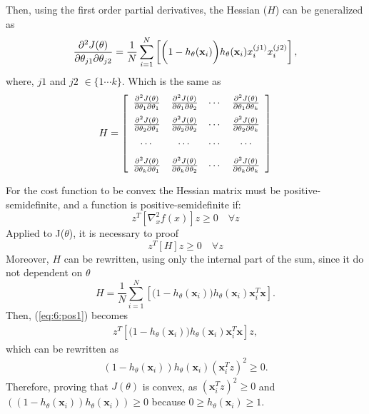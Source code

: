 Then, using the first order partial derivatives, the Hessian ($H$) can be generalized as
\begin{equation}
  \frac{\partial^2 J(\theta)}{\partial\theta_{j1}\partial\theta_{j2}}=\frac{1}{N}\sum_{i=1}^{N}
  \left[\bigg(1-h_\theta(\mathbf{x}_i)\bigg)h_\theta(\mathbf{x}_i)x_i^{(j1)}x_i^{(j2)}\right],
\end{equation}
where, $j1$ and $j2$ $\in \{1\cdots k\}$. Which is the same as
\begin{equation}
H=\left[ \begin{array}{cccc}
  \frac{\partial^2 J(\theta)}{\partial\theta_{1}\partial\theta_{1}} & \frac{\partial^2 J(\theta)}{\partial\theta_{1}\partial\theta_{2}} & \cdots & \frac{\partial^2 J(\theta)}{\partial\theta_{1}\partial\theta_{k}} \\[0.1in]  
  \frac{\partial^2 J(\theta)}{\partial\theta_{2}\partial\theta_{1}} & \frac{\partial^2 J(\theta)}{\partial\theta_{2}\partial\theta_{2}} & \cdots & \frac{\partial^2 J(\theta)}{\partial\theta_{2}\partial\theta_{k}} \\[0.1in]  
  \cdots & \cdots & \cdots & \cdots \\[0.1in]  
  \frac{\partial^2 J(\theta)}{\partial\theta_{k}\partial\theta_{1}} & \frac{\partial^2 J(\theta)}{\partial\theta_{k}\partial\theta_{2}} & \cdots & \frac{\partial^2 J(\theta)}{\partial\theta_{k}\partial\theta_{k}}  
\end{array} \right]
\end{equation}

For the cost function to be convex the Hessian matrix	must be positive-semidefinite, and
a function is positive-semidefinite if:  
\begin{equation}
  z^T\left[\nabla_x^2f(x)\right]z \ge 0 \quad  \forall z
\end{equation}
Applied to J($\theta$), it is necessary to proof
\begin{equation}\label{eq:6:pos1}
  z^T\left[H \right]z \ge 0 \quad  \forall z
\end{equation}
Moreover, $H$ can be rewritten, using only the internal part of the sum, since it do not 
dependent on $\theta$
\begin{equation}
 H = \frac{1}{N}\sum_{i=1}^{N} \left[ 
\bigg(1-h_\theta(\mathbf{x}_i)\bigg)h_\theta(\mathbf{x}_i)\mathbf{x}_i^T \mathbf{x} \right]. 
\end{equation}
Then, (\ref{eq:6:pos1}) becomes
\begin{align}
  z^T \left[\bigg(1-h_\theta(\mathbf{x}_i)\bigg)h_\theta(\mathbf{x}_i)\mathbf{x}_i^T 
\mathbf{x}\right] z,
\end{align}
which can be rewritten as
\begin{align}
  (1-h_\theta(\mathbf{x}_i))h_\theta(\mathbf{x}_i)\left(\mathbf{x}_i^Tz\right)^2 \ge 0.
\end{align}
Therefore, proving that $J(\theta)$ is convex, as $\left(\mathbf{x}_i^Tz\right)^2 
\ge 0$ and \\ $\left((1-h_\theta(\mathbf{x}_i))h_\theta(\mathbf{x}_i)\right)\ge 0$ because $0\ge 
h_\theta(\mathbf{x}_i) \ge 1$.


